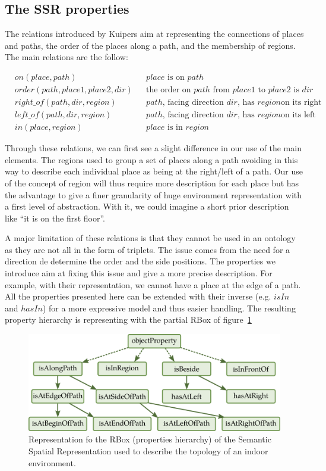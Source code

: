 \subsection{The SSR properties}

The relations introduced by Kuipers aim at representing the connections of places and paths, the order of the places along a path, and the membership of regions. The main relations are the follow:

\begin{align*}
&on(place,path) && place \text{ is on } path \\
&order(path,place1,place2,dir) && \text{the order on } path \text{ from } place1 \text{ to } place2 \text{ is } dir \\
&right\_of(path,dir,region) && path \text{, facing direction } dir \text{, has } region \text{on its right}\\
&left\_of(path,dir,region) && path \text{, facing direction } dir \text{, has } region \text{on its left} \\
&in(place,region) && place \text{ is in } region
\end{align*}

Through these relations, we can first see a slight difference in our use of the main elements. The regions used to group a set of places along a path avoiding in this way to describe each individual place as being at the right/left of a path. Our use of the concept of region will thus require more description for each place but has the advantage to give a finer granularity of huge environment representation with a first level of abstraction. With it, we could imagine a short prior description like ``it is on the first floor''.

A major limitation of these relations is that they cannot be used in an ontology as they are not all in the form of triplets. The issue comes from the need for a direction de determine the order and the side positions. The properties we introduce aim at fixing this issue and give a more precise description. For example, with their representation, we cannot have a place at the edge of a path. All the properties presented here can be extended with their inverse (e.g. $isIn$ and $hasIn$) for a more expressive model and thus easier handling. The resulting property hierarchy is representing with the partial RBox of figure~\ref{fig:chap3_rbox} 

\begin{figure}[ht!]
\centering
\includegraphics[scale=0.4]{figures/chapter3/ssr_rbox.png}
\caption{\label{fig:chap3_rbox} Representation fo the RBox (properties hierarchy) of the Semantic Spatial Representation used to describe the topology of an indoor environment.}
\end{figure}

